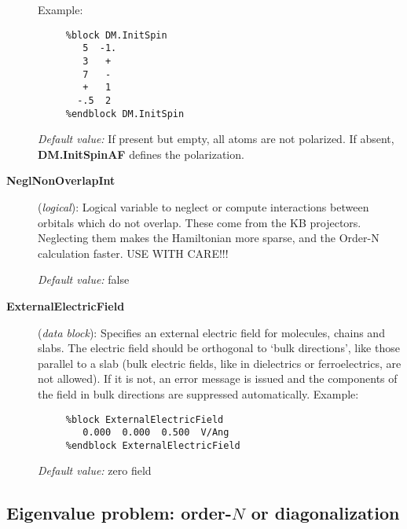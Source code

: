\begin{description}
Example:

\begin{verbatim}
     %block DM.InitSpin
        5  -1.
        3   +
        7   -
        +   1
       -.5  2
     %endblock DM.InitSpin
\end{verbatim}

{\it Default value:} If present but empty, all atoms are not polarized. 
If absent, {\bf DM.InitSpinAF} defines the polarization.


\item[{\bf NeglNonOverlapInt}] ({\it logical}): Logical variable
to neglect or compute interactions between orbitals
which do not overlap. These come from the KB projectors.
Neglecting them makes the Hamiltonian more sparse, and
the Order-N calculation faster.  USE WITH CARE!!!

{\it Default value:} false
        
\item[{\bf ExternalElectricField}] ({\it data block}):
Specifies an external electric field for molecules, chains and slabs.
The electric field should be orthogonal to `bulk directions', like
those parallel to a slab (bulk electric fields, like in
dielectrics or ferroelectrics, are not allowed). If it is not, an
error message is issued and the components of the field in bulk
directions are suppressed automatically. Example:

\begin{verbatim}
     %block ExternalElectricField
        0.000  0.000  0.500  V/Ang
     %endblock ExternalElectricField
\end{verbatim}

{\it Default value:} zero field

\end{description}



\vspace{5pt}
\subsection{Eigenvalue problem: order-$N$ or diagonalization}

